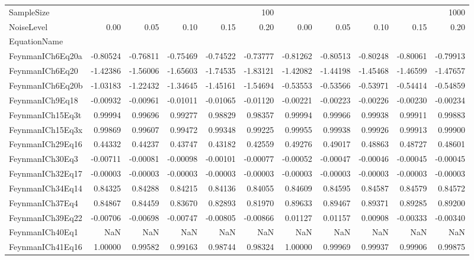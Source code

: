 \begin{tabular}{lrrrrrrrrrr}
\toprule
SampleSize & \multicolumn{5}{r}{100} & \multicolumn{5}{r}{1000} \\
NoiseLevel & 0.00 & 0.05 & 0.10 & 0.15 & 0.20 & 0.00 & 0.05 & 0.10 & 0.15 & 0.20 \\
EquationName &  &  &  &  &  &  &  &  &  &  \\
\midrule
FeynmanICh6Eq20a & -0.80524 & -0.76811 & -0.75469 & -0.74522 & -0.73777 & -0.81262 & -0.80513 & -0.80248 & -0.80061 & -0.79913 \\
FeynmanICh6Eq20 & -1.42386 & -1.56006 & -1.65603 & -1.74535 & -1.83121 & -1.42082 & -1.44198 & -1.45468 & -1.46599 & -1.47657 \\
FeynmanICh6Eq20b & -1.03183 & -1.22432 & -1.34645 & -1.45161 & -1.54694 & -0.53553 & -0.53566 & -0.53971 & -0.54414 & -0.54859 \\
FeynmanICh9Eq18 & -0.00932 & -0.00961 & -0.01011 & -0.01065 & -0.01120 & -0.00221 & -0.00223 & -0.00226 & -0.00230 & -0.00234 \\
FeynmanICh15Eq3t & 0.99994 & 0.99696 & 0.99277 & 0.98829 & 0.98357 & 0.99994 & 0.99966 & 0.99938 & 0.99911 & 0.99883 \\
FeynmanICh15Eq3x & 0.99869 & 0.99607 & 0.99472 & 0.99348 & 0.99225 & 0.99955 & 0.99938 & 0.99926 & 0.99913 & 0.99900 \\
FeynmanICh29Eq16 & 0.44332 & 0.44237 & 0.43747 & 0.43182 & 0.42559 & 0.49276 & 0.49017 & 0.48863 & 0.48727 & 0.48601 \\
FeynmanICh30Eq3 & -0.00711 & -0.00081 & -0.00098 & -0.00101 & -0.00077 & -0.00052 & -0.00047 & -0.00046 & -0.00045 & -0.00045 \\
FeynmanICh32Eq17 & -0.00003 & -0.00003 & -0.00003 & -0.00003 & -0.00003 & -0.00003 & -0.00003 & -0.00003 & -0.00003 & -0.00003 \\
FeynmanICh34Eq14 & 0.84325 & 0.84288 & 0.84215 & 0.84136 & 0.84055 & 0.84609 & 0.84595 & 0.84587 & 0.84579 & 0.84572 \\
FeynmanICh37Eq4 & 0.84867 & 0.84459 & 0.83670 & 0.82893 & 0.81970 & 0.89633 & 0.89467 & 0.89371 & 0.89285 & 0.89200 \\
FeynmanICh39Eq22 & -0.00706 & -0.00698 & -0.00747 & -0.00805 & -0.00866 & 0.01127 & 0.01157 & 0.00908 & -0.00333 & -0.00340 \\
FeynmanICh40Eq1 & NaN & NaN & NaN & NaN & NaN & NaN & NaN & NaN & NaN & NaN \\
FeynmanICh41Eq16 & 1.00000 & 0.99582 & 0.99163 & 0.98744 & 0.98324 & 1.00000 & 0.99969 & 0.99937 & 0.99906 & 0.99875 \\

\end{tabular}
